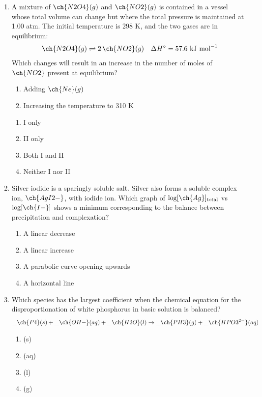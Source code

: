 \documentclass[twocolumn,10pt]{article}
\begin{document}
\begin{enumerate}[label=\arabic*., leftmargin=*]
\item A mixture of $\ch{N2O4}(g)$ and $\ch{NO2}(g)$ is contained in a vessel whose total volume can change but where the total pressure is maintained at 1.00 atm. The initial temperature is 298 K, and the two gases are in equilibrium:
\[ \ch{N2O4}(g) \rightleftharpoons 2\,\ch{NO2}(g) \quad \Delta H^\circ = 57.6\text{ kJ mol}^{-1} \]
Which changes will result in an increase in the number of moles of $\ch{NO2}$ present at equilibrium?
\begin{enumerate}[label=\Roman*.]
    \item Adding $\ch{Ne}(g)$
    \item Increasing the temperature to 310 K
\end{enumerate}
\begin{enumerate}[label=(\Alph*)]
    \item I only \item II only \item Both I and II \item Neither I nor II
\end{enumerate}

\item Silver iodide is a sparingly soluble salt. Silver also forms a soluble complex ion, $\ch{AgI2-}$, with iodide ion. Which graph of $\log[\ch{Ag}]_{\text{total}}$ vs $\log[\ch{I-}]$ shows a minimum corresponding to the balance between precipitation and complexation?
\begin{enumerate}[label=(\Alph*)]
    \item A linear decrease \item A linear increase \item A parabolic curve opening upwards \item A horizontal line
\end{enumerate}

\item Which species has the largest coefficient when the chemical equation for the disproportionation of white phosphorus in basic solution is balanced?
\[ \_ \ch{P4}(s) + \_ \ch{OH-}(aq) + \_ \ch{H2O}(l) \rightarrow \_ \ch{PH3}(g) + \_ \ch{HPO3^{2-}}(aq) \]
\begin{enumerate}[label=(\Alph*)]
    \item {}(s) \item {}(aq) \item {}(l) \item {}(g)
\end{enumerate}


\end{enumerate}
\end{document}
